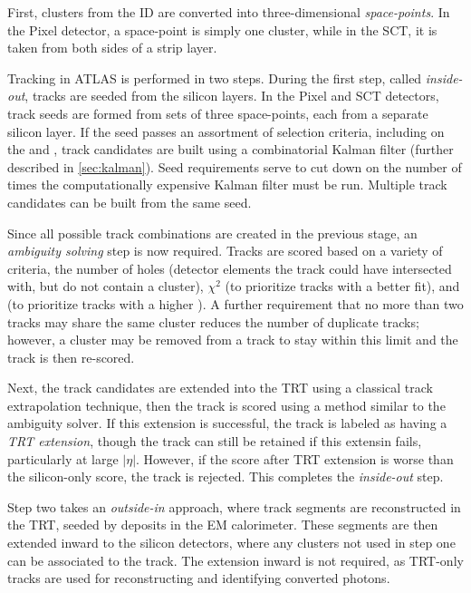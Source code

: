 First, clusters from the \ac{ID} are converted into three-dimensional \emph{space-points}. In the Pixel detector, a space-point is simply one cluster, while in the \ac{SCT}, it is taken from both sides of a strip layer.

Tracking in ATLAS is performed in two steps. During the first step, called \emph{inside-out}, tracks are seeded from the silicon layers. In the Pixel and \ac{SCT} detectors, track seeds are formed from sets of three space-points, each from a separate silicon layer. If the seed passes an assortment of selection criteria, including on the \pt and \dzero, track candidates are built using a combinatorial Kalman filter (further described in \autoref{sec:kalman}). Seed requirements serve to cut down on the number of times the computationally expensive Kalman filter must be run. Multiple track candidates can be built from the same seed.

Since all possible track combinations are created in the previous stage, an \emph{ambiguity solving} step is now required. Tracks are scored based on a variety of criteria, the number of holes (detector elements the track could have intersected with, but do not contain a cluster), $\chi^{2}$ (to prioritize tracks with a better fit), and \pt (to prioritize tracks with a higher \pt). A further requirement that no more than two tracks may share the same cluster reduces the number of duplicate tracks; however, a cluster may be removed from a track to stay within this limit and the track is then re-scored. 

Next, the track candidates are extended into the  \ac{TRT} using a classical track extrapolation technique, then the track is scored using a method similar to the ambiguity solver. If this extension is successful, the track is labeled as having a \emph{\ac{TRT} extension}, though the track can still be retained if this extensin fails, particularly at large $|\eta|$. However, if the score after TRT extension is worse than the silicon-only score, the track is rejected. This completes the \emph{inside-out} step.



Step two takes an \emph{outside-in} approach, where track segments are reconstructed in the \ac{TRT}, seeded by deposits in the \ac{EM} calorimeter. These segments are then extended inward to the silicon detectors, where any clusters not used in step one can be associated to the track. The extension inward is not required, as \ac{TRT}-only tracks are used for reconstructing and identifying converted photons. 


